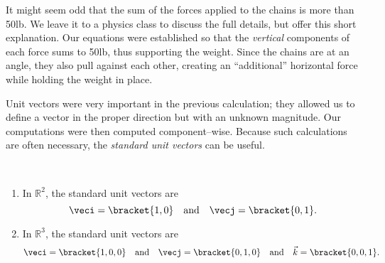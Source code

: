 {It might seem odd that the sum of the forces applied to the chains is more than 50lb. We leave it to a physics class to discuss the full details, but offer this short explanation. Our equations were established so that the \textit{vertical} components of each force sums to 50lb, thus supporting the weight. Since the chains are at an angle, they also pull against each other, creating an ``additional'' horizontal force while holding the weight in place.}

Unit vectors were very important in the previous calculation; they allowed us to define a vector in the proper direction but with an unknown magnitude. Our computations were then computed component--wise. Because such calculations are often necessary, the \textit{standard unit vectors} can be useful.

{\mbox{}\\[-2\baselineskip]\begin{enumerate}
	\item In $\mathbb{R}^2$, the standard unit vectors are
	\[\veci =\bracket{1,0}\quad \text{and}\quad \vecj =\bracket{0,1}.\]
	\item In $\mathbb{R}^3$, the standard unit vectors are
	\[\veci =\bracket{1,0,0}\quad \text{and}\quad \vecj =\bracket{0,1,0}\quad \text{and}\quad \vec k =\bracket{0,0,1}.\]
\end{enumerate}}

